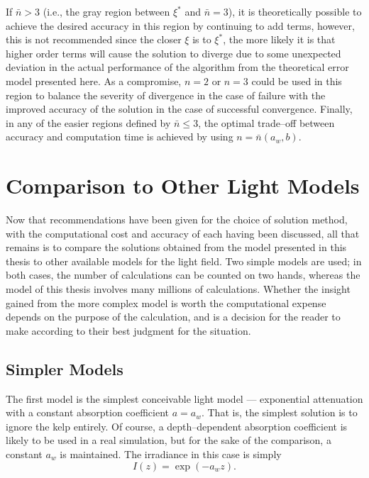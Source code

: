 If $\bar{n}>3$ (i.e., the gray region between $\xi^*$ and $\bar{n}=3$), it is theoretically possible to achieve the desired accuracy in this region by continuing to add terms, however, this is not recommended since the closer $\xi$ is to $\xi^*$, the more likely it is that higher order terms will cause the solution to diverge due to some unexpected deviation in the actual performance of the algorithm from the theoretical error model presented here.
As a compromise, $n=2$ or $n=3$ could be used in this region to balance the severity of divergence in the case of failure with the improved accuracy of the solution in the case of successful convergence.
Finally, in any of the easier regions defined by $\bar{n} \leq 3$, the optimal trade--off between accuracy and computation time is achieved by using $n=\bar{n}(a_w, b)$.

\section{Comparison to Other Light Models}

Now that recommendations have been given for the choice of solution method, with the computational cost and accuracy of each having been discussed, all that remains is to compare the solutions obtained from the model presented in this thesis to other available models for the light field.
Two simple models are used; in both cases, the number of calculations can be counted on two hands, whereas the model of this thesis involves many millions of calculations.
Whether the insight gained from the more complex model is worth the computational expense depends on the purpose of the calculation, and is a decision for the reader to make according to their best judgment for the situation.

\subsection{Simpler Models}
The first model is the simplest conceivable light model --- exponential attenuation with a constant absorption coefficient $a=a_w$.
That is, the simplest solution is to ignore the kelp entirely.
Of course, a depth--dependent absorption coefficient is likely to be used in a real simulation, but for the sake of the comparison, a constant $a_w$ is maintained.
The irradiance in this case is simply
\begin{equation}
  I(z) = \exp\left(-a_w z \right).
\end{equation}

